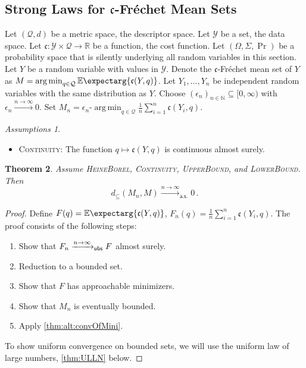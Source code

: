 \documentclass{scrartcl}
\renewcommand{\subset}{\subseteq}
\newcommand{\Ex}{\E\expectarg}
\newcommand*{\mc}[1]{\mathcal{#1}}
\newcommand*{\ms}[1]{\mathsf{#1}}
\newcommand*{\mf}[1]{\mathfrak{#1}}
\newcommand{\N}{\mathbb{N}}
\newcommand{\R}{\mathbb{R}}
\newcommand{\equationFullstop}{\, .}
\newcommand{\eqfs}{\equationFullstop}
\DeclareMathOperator*{\argmin}{arg\,min}
\theoremstyle{plain}\newtheorem{theorem}{Theorem}[section]
\theoremstyle{definition}
\theoremstyle{remark}
\newtheorem{assumptions}[theorem]{Assumptions}
\begin{document}
\begin{appendix}
\subsection{Strong Laws for $\mf c$-Fréchet Mean Sets}\label{ssec:alt:gen}
Let $(\mc Q, d)$ be a metric space, the descriptor space. Let $\mc Y$ be a set, the data space. Let $\mf c\colon \mc Y \times\mc Q \to \R$ be a function, the cost function. Let $(\Omega, \Sigma, \Pr)$ be a probability space that is silently underlying all random variables in this section. Let $Y$ be a random variable with values in $\mc Y$. Denote the $\mf c$-Fréchet mean set of $Y$ as $M = \argmin_{q\in\mc Q} \Ex{\mf c(Y, q)}$.
Let $Y_1, \dots, Y_n$ be independent random variables with the same distribution as $Y$.
Choose $(\epsilon_n)_{n\in\N}\subset [0,\infty)$ with $\epsilon_n \xrightarrow{n\to\infty}0$. Set $M_n = \epsilon_n\text{-}\argmin_{q\in\mc Q} \frac1n \sum_{i=1}^n \mf c(Y_i, q)$.
\begin{assumptions}\mbox{ }
\begin{itemize}
	\item \textsc{Continuity}:  The function $q \mapsto \mf c(Y, q)$ is continuous almost surely.
	\end{itemize}
\end{assumptions}
\begin{theorem}\label{thm:alt:consistency}
	Assume \textsc{HeineBorel}, \textsc{Continuity}, \textsc{UpperBound}, and \textsc{LowerBound}. Then
	\begin{equation*}
		d_\subset(M_n, M) \xrightarrow{n\to\infty}_{\ms{a.s.}} 0
		\eqfs
	\end{equation*}
\end{theorem}
\begin{proof}
Define $F(q) = \Ex{\mf c(Y, q)}$, $F_n(q) = \frac1n\sum_{i=1}^n \mf c(Y_i, q)$.  The proof consists of the following steps:
\begin{enumerate}
\item Show that $F_n \xrightarrow{n\to\infty}_{\mathsf{ubs}} F$ almost surely.
\item Reduction to a bounded set.
\item Show that $F$ has approachable minimizers.
\item Show that $M_n$ is eventually bounded.
\item Apply \autoref{thm:alt:convOfMini}.
\end{enumerate}
\underline{}
To show uniform convergence on bounded sets, we will use the uniform law of large numbers, \autoref{thm:ULLN} below.

\end{proof}
\end{appendix}
\end{document}

